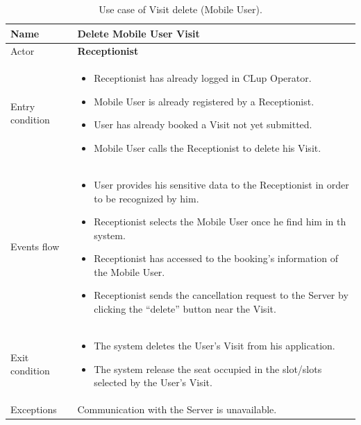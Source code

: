 \begin{table}[H]\begin{tabular}{|p{5cm} | p{7cm} | }
	\hline
	Name & \textbf{Delete Mobile User Visit}  \\
	\hline
	Actor & \textbf{Receptionist} \\
	\hline
	Entry condition &
	\begin{itemize}
        \item Receptionist has already logged in CLup Operator. 
 		\item Mobile User is already registered by a Receptionist.
		\item User has already booked a Visit not yet submitted. 
        \item Mobile User calls the Receptionist to delete his Visit.
	\end{itemize} \\
	\hline
	Events flow & 
	\begin{itemize}
		\item User provides his sensitive data to the Receptionist in order to be recognized by him. 
        \item Receptionist selects the Mobile User once he find him in th system.
		\item Receptionist has accessed to the booking's information of the Mobile User.
		\item Receptionist sends the cancellation request to the Server by clicking the “delete” button near the Visit.
	\end{itemize} \\
	\hline
	Exit condition & \begin{itemize}	
		\item The system deletes the User's Visit from his application.
		\item The system release the seat occupied in the slot/slots selected by the User's Visit.
	\end{itemize}\\
	\hline 
	Exceptions & 
	Communication with the Server is unavailable. \\
	\hline
\end{tabular}
\caption{Use case of Visit delete (Mobile User).}

\end{table}
\bigbreak

